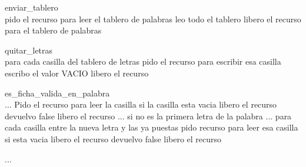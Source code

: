 enviar_tablero\\

pido el recurso para leer el tablero de palabras
leo todo el tablero
libero el recurso para el tablero de palabras


quitar_letras\\

para cada casilla del tablero de letras
	pido el recurso para escribir esa casilla
		escribo el valor VACIO
	libero el recurso

es_ficha_valida_en_palabra\\
...
Pido el recurso para leer la casilla
si la casilla esta vacia
	libero el recurso
	devuelvo false
libero el recurso
...
si no es la primera letra de la palabra 
	...
	para cada casilla entre la nueva letra y las ya puestas
		pido recurso para leer esa casilla
		si esta vacia
			libero el recurso
			devuelvo false
		libero el recurso
						
...


